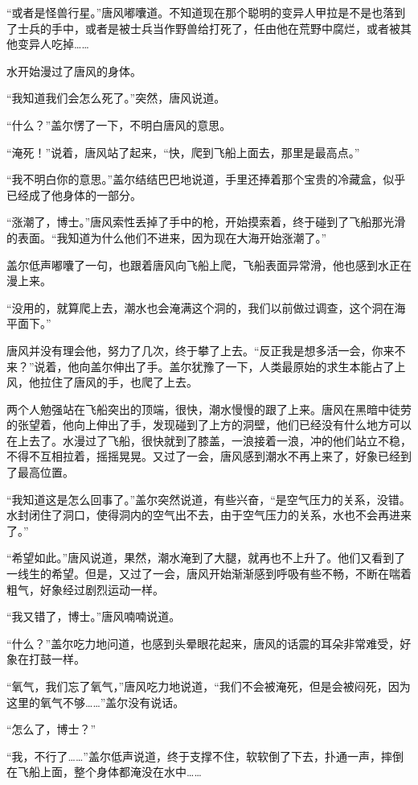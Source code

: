 “或者是怪兽行星。”唐风嘟囔道。不知道现在那个聪明的变异人甲拉是不是也落到了士兵的手中，或者是被士兵当作野兽给打死了，任由他在荒野中腐烂，或者被其他变异人吃掉……

水开始漫过了唐风的身体。

“我知道我们会怎么死了。”突然，唐风说道。

“什么？”盖尔愣了一下，不明白唐风的意思。

“淹死！”说着，唐风站了起来，“快，爬到飞船上面去，那里是最高点。”

“我不明白你的意思。”盖尔结结巴巴地说道，手里还捧着那个宝贵的冷藏盒，似乎已经成了他身体的一部分。

“涨潮了，博士。”唐风索性丢掉了手中的枪，开始摸索着，终于碰到了飞船那光滑的表面。“我知道为什么他们不进来，因为现在大海开始涨潮了。”

盖尔低声嘟囔了一句，也跟着唐风向飞船上爬，飞船表面异常滑，他也感到水正在漫上来。

“没用的，就算爬上去，潮水也会淹满这个洞的，我们以前做过调查，这个洞在海平面下。”

唐风并没有理会他，努力了几次，终于攀了上去。“反正我是想多活一会，你来不来？”说着，他向盖尔伸出了手。盖尔犹豫了一下，人类最原始的求生本能占了上风，他拉住了唐风的手，也爬了上去。

两个人勉强站在飞船突出的顶端，很快，潮水慢慢的跟了上来。唐风在黑暗中徒劳的张望着，他向上伸出了手，发现碰到了上方的洞壁，他们已经没有什么地方可以在上去了。水漫过了飞船，很快就到了膝盖，一浪接着一浪，冲的他们站立不稳，不得不互相拉着，摇摇晃晃。又过了一会，唐风感到潮水不再上来了，好象已经到了最高位置。

“我知道这是怎么回事了。”盖尔突然说道，有些兴奋，“是空气压力的关系，没错。水封闭住了洞口，使得洞内的空气出不去，由于空气压力的关系，水也不会再进来了。”

“希望如此。”唐风说道，果然，潮水淹到了大腿，就再也不上升了。他们又看到了一线生的希望。但是，又过了一会，唐风开始渐渐感到呼吸有些不畅，不断在喘着粗气，好象经过剧烈运动一样。

“我又错了，博士。”唐风喃喃说道。

“什么？”盖尔吃力地问道，也感到头晕眼花起来，唐风的话震的耳朵非常难受，好象在打鼓一样。

“氧气，我们忘了氧气，”唐风吃力地说道，“我们不会被淹死，但是会被闷死，因为这里的氧气不够……”盖尔没有说话。

“怎么了，博士？”

“我，不行了……”盖尔低声说道，终于支撑不住，软软倒了下去，扑通一声，摔倒在飞船上面，整个身体都淹没在水中……

